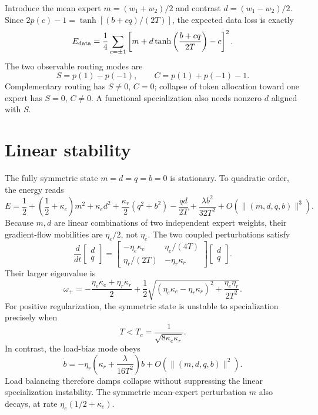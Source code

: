 \documentclass[11pt]{article}
\begin{document}
Introduce the mean expert $m=(w_1+w_2)/2$ and contrast
$d=(w_1-w_2)/2$. Since $2p(c)-1=\tanh[(b+cq)/(2T)]$,
the expected data loss is exactly
\begin{equation}
E_{\rm data}
=\frac14\sum_{c=\pm1}
\left[m+d\tanh\left(\frac{b+cq}{2T}\right)-c\right]^2.
\label{eq:reduced}
\end{equation}
The two observable routing modes are
\begin{equation}
S=p(1)-p(-1),\qquad C=p(1)+p(-1)-1.
\label{eq:orders}
\end{equation}
Complementary routing has $S\ne0$, $C=0$; collapse of token
allocation toward one expert has $S=0$, $C\ne0$. A functional
specialization also needs nonzero $d$ aligned with $S$.

\section{Linear stability}

The fully symmetric state $m=d=q=b=0$ is stationary.
To quadratic order, the energy reads
\begin{equation}
E=\frac12+\left(\frac12+\kappa_e\right)m^2
+\kappa_e d^2+\frac{\kappa_r}{2}(q^2+b^2)
-\frac{qd}{2T}+\frac{\lambda b^2}{32T^2}
+O(\|(m,d,q,b)\|^3).
\label{eq:expansion}
\end{equation}
Because $m,d$ are linear combinations of two independent expert
weights, their gradient-flow mobilities are $\eta_e/2$, not $\eta_e$.
The two coupled perturbations satisfy
\begin{equation}
\frac{d}{dt}
\begin{bmatrix}d\\q\end{bmatrix}
=
\begin{bmatrix}
-\eta_e\kappa_e&\eta_e/(4T)\\
\eta_r/(2T)&-\eta_r\kappa_r
\end{bmatrix}
\begin{bmatrix}d\\q\end{bmatrix}.
\label{eq:jacobian}
\end{equation}
Their larger eigenvalue is
\begin{equation}
\omega_+=-\frac{\eta_e\kappa_e+\eta_r\kappa_r}{2}
+\frac12\sqrt{(\eta_e\kappa_e-\eta_r\kappa_r)^2
+\frac{\eta_e\eta_r}{2T^2}}.
\label{eq:growth}
\end{equation}
For positive regularization, the symmetric state is unstable to
specialization precisely when
\begin{equation}
T<T_c=\frac{1}{\sqrt{8\kappa_e\kappa_r}}.
\label{eq:critical}
\end{equation}
In contrast, the load-bias mode obeys
\begin{equation}
\dot b=-\eta_r\left(\kappa_r+
\frac{\lambda}{16T^2}\right)b+O(\|(m,d,q,b)\|^2).
\label{eq:collapse}
\end{equation}
Load balancing therefore damps collapse without suppressing the
linear specialization instability. The symmetric mean-expert
perturbation $m$ also decays, at rate
$\eta_e(1/2+\kappa_e)$.
\end{document}
